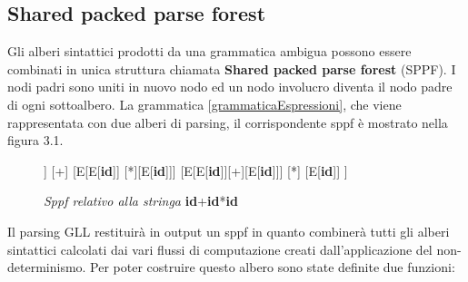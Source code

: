 \subsection{Shared packed parse forest}
Gli alberi sintattici prodotti da una grammatica ambigua \cite{tesi: lr} possono essere combinati in unica struttura chiamata \textbf{Shared packed parse forest} (SPPF). I nodi padri sono uniti in nuovo nodo ed un nodo involucro diventa il nodo padre di ogni sottoalbero. La grammatica \ref{grammaticaEspressioni}, che viene rappresentata con due alberi di parsing, il corrispondente sppf è mostrato nella figura 3.1. 
\begin{figure}[hbpb]
	\centering
	\begin{forest}
	[E
	[E[\textbf{id}]] [+] [E[E[\textbf{id}]] [*][E[\textbf{id}]]]
	[E[E[\textbf{id}]][+][E[\textbf{id}]]] [*] [E[\textbf{id}]]
	]
	\end{forest}
	\caption{\textit{Sppf relativo alla stringa} \textbf{id}+\textbf{id}*\textbf{id} }\label{sppf}
\end{figure}
Il parsing GLL restituirà in output un sppf in quanto combinerà tutti gli alberi sintattici calcolati dai vari flussi di computazione creati dall'applicazione del non-determinismo. Per poter costruire questo albero sono state definite due funzioni:
